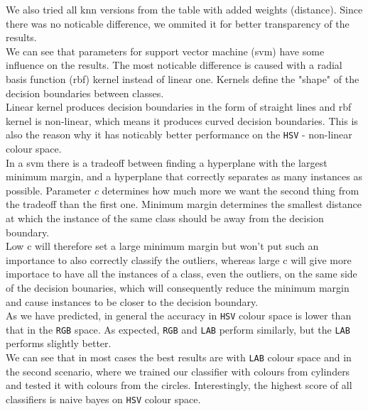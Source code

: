 \documentclass[12pt,a4paper]{article}
\begin{document}
	We also tried all knn versions from the table with added weights (distance). Since there was no noticable difference, we ommited it for better transparency of the results. \\

	We can see that parameters for support vector machine (svm) have some influence on the results. The most noticable difference is caused with a radial basis function (rbf) kernel instead of linear one. Kernels define the "shape" of the decision boundaries between classes. \\

	Linear kernel produces decision boundaries in the form of straight lines and rbf kernel is non-linear, which means it produces curved decision boundaries. This is also the reason why it has noticably better performance on the \texttt{HSV} - non-linear colour space. \\

	In a svm there is a tradeoff between finding a hyperplane with the largest minimum margin, and a hyperplane that correctly separates as many instances as possible. Parameter $c$ determines how much more we want the second thing from the tradeoff than the first one. Minimum margin determines the smallest distance at which the instance of the same class should be away from the decision boundary. \\
	
	Low c will therefore set a large minimum margin but won't put such an importance to also correctly classify the outliers, whereas large c will give more importace to have all the instances of a class, even the outliers, on the same side of the decision bounaries, which will consequently reduce the minimum margin and cause instances to be closer to the decision boundary. \\

	As we have predicted, in general the accuracy in \texttt{HSV} colour space is lower than that in the \texttt{RGB} space. As expected, \texttt{RGB} and \texttt{LAB} perform similarly, but the \texttt{LAB} performs slightly better. \\

	We can see that in most cases the best results are with \texttt{LAB} colour space and in the second scenario, where we trained our classifier with colours from cylinders and tested it with colours from the circles. Interestingly, the highest score of all classifiers is naive bayes on \texttt{HSV} colour space. \\
\end{document}
